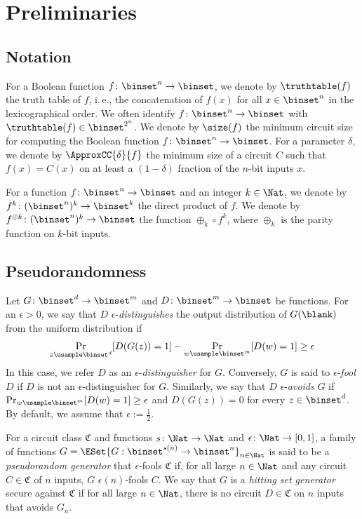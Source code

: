 \documentclass[11pt]{article}
\numberwithin{equation}{section}
\theoremstyle{definition}
\theoremstyle{plain}
\newcommand{\ie}{i.\,e.}
\begin{document}
\section{Preliminaries}
\label{section_preliminaries}


\subsection{Notation}

For a Boolean function $f \colon \binset^n \to \binset$,
we denote by $\truthtable(f)$ the truth table of $f$, \ie, the concatenation of $f(x)$ for all $x \in \binset^n$ in the lexicographical order.
We often identify $f \colon \binset^n \to \binset$ with $\truthtable(f) \in \binset^{2^n}$.
We denote by $\size(f)$ the minimum circuit size for computing the Boolean function $f \colon \binset^n \to \binset$.
For a parameter $\delta$, we denote by $\ApproxCC{\delta}{f}$
the minimum size of a circuit $C$ such that $f(x) = C(x)$ on at least a $(1 - \delta)$ fraction of the $n$-bit inputs $x$.
%
%
%

%
%
%
%
%
%

For a function $f \colon \binset^n \to \binset$ and an integer $k \in \Nat$, we denote by $f^{k} \colon (\binset^n)^k \to \binset^k$
the direct product of $f$.
We denote by $f^{\oplus k} \colon (\binset^n)^k \to \binset$ the function $\oplus_k \circ f^{k}$, where $\oplus_k$ is the parity function on $k$-bit inputs.


\subsection{Pseudorandomness}
Let $G \colon \binset^d \to \binset^m$
and $D \colon \binset^m \to \binset$
be functions.
For an $\epsilon > 0$,
we say that $D$ $\epsilon$-\emph{distinguishes}
the output distribution of $G(\blank)$ from
the uniform distribution
if
$$
  \Pr_{z \usample \binset^d} [ D(G(z)) = 1 ]
  - \Pr_{w \usample \binset^m} [ D(w) = 1 ]
  \ge
  \epsilon
$$
In this case, we refer $D$ as an $\epsilon$-\emph{distinguisher} for $G$.
Conversely, $G$ is said to $\epsilon$-\emph{fool} $D$ if $D$ is not an $\epsilon$-distinguisher for $G$.
Similarly,
we say that $D$ $\epsilon$-\emph{avoids}
$G$
if
$\Pr_{w \usample \binset^m} [D(w) = 1] \ge \epsilon$
and
$D(G(z)) = 0$ for every $z \in \binset^d$.
By default, we assume that $\epsilon := \frac{1}{2}$.

For a circuit class $\mathfrak{C}$ and functions $s \colon \Nat \to \Nat$ and $\epsilon \colon \Nat \to [0,1]$,
a family of functions $G = \ESet{ G : \binset^{s(n)} \to \binset^n }_{n \in \Nat}$
is said to be a \emph{pseudorandom generator} that $\epsilon$-fools $\mathfrak{C}$
if,
for all large $n \in \Nat$ and any circuit $C \in \mathfrak{C}$ of $n$ inputs,
$G$ $\epsilon(n)$-fools $C$.
We say that $G$ is a \emph{hitting set generator} secure against $\mathfrak C$
if for all large $n \in \Nat$,
there is no circuit $D \in \mathfrak C$ on $n$ inputs
that avoids $G_n$.
\end{document}
